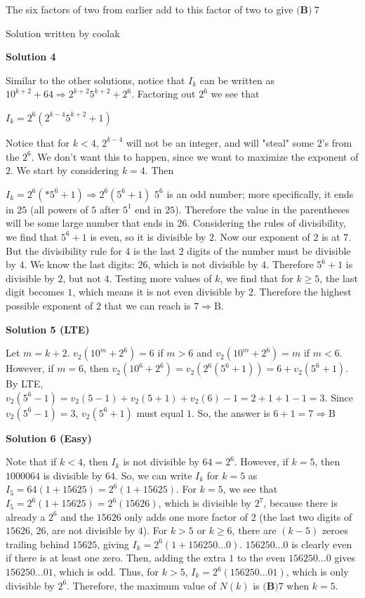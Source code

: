 \begin{enumerate}
 The six factors of two from earlier add to this factor of two to give $\textbf{(B)}\ 7\qquad$

 Solution written by coolak

 


 



\textbf{Solution 4}

Similar to the other solutions, notice that $I_k$ can be written as $10^{k+2}+64 \Rightarrow 2^{k+2}5^{k+2}+2^6$. Factoring out $2^6$ we see that

 $I_k = 2^6(2^{k-4}5^{k+2}+1)$

 Notice that for $k < 4$, $2^{k-4}$ will not be an integer, and will "steal" some $2$'s from the $2^6$. We don't want this to happen, since we want to maximize the exponent of $2$. We start by considering $k = 4$. Then

 $I_k = 2^6(*5^6+1) \Rightarrow 2^6(5^6+1)$
$5^6$ is an odd number; more specifically, it ends in $25$ (all powers of $5$ after $5^1$ end in $25$). Therefore the value in the parentheses will be some large number that ends in $26$. Considering the rules of divisibility, we find that $5^6+1$ is even, so it is divisible by $2$. Now our exponent of $2$ is at $7$. But the divisibility rule for $4$ is the last $2$ digits of the number must be divisible by $4$. We know the last digits: $26$, which is not divisible by $4$. Therefore $5^6 + 1$ is divisible by $2$, but not $4$. Testing more values of $k$, we find that for $k \ge 5$, the last digit becomes $1$, which means it is not even divisible by $2$. Therefore the highest possible exponent of $2$ that we can reach is $7 \Rightarrow \boxed{\text{B}}$.

 



\textbf{Solution 5 (LTE)}

Let $m=k+2$. $v_2(10^m+2^6)=6$ if $m>6$ and $v_2(10^m+2^6)=m$ if $m<6$. However, if $m=6$, then $v_2(10^6+2^6)=v_2(2^6(5^6+1))=6+v_2(5^6+1)$. By LTE, $v_2(5^6-1)=v_2(5-1)+v_2(5+1)+v_2(6)-1=2+1+1-1=3$. Since $v_2(5^6-1)=3$, $v_2(5^6+1)$ must equal $1$. So, the answer is $6+1=7 \Rightarrow \boxed{\text{B}}$




\textbf{Solution 6 (Easy)}

Note that if $k<4$, then $I_k$ is not divisible by $64=2^6$. However, if $k=5$, then $1000064$ is divisible by $64$. So, we can write $I_k$ for $k=5$ as $I_5=64(1+15625)=2^6(1+15625)$. For $k=5$, we see that $I_5=2^6(1+15625)=2^6(15626)$, which is divisible by $2^7$, because there is already a $2^6$ and the $15626$ only adds one more factor of $2$ (the last two digits of $15626$, $26$, are not divisible by $4$). For $k>5$ or $k\geq6$, there are $(k-5)$ zeroes trailing behind $15625$, giving $I_k=2^6(1+156250...0)$. $156250...0$ is clearly even if there is at least one zero. Then, adding the extra $1$ to the even $156250...0$ gives $156250...01$, which is odd. Thus, for $k>5$, $I_k=2^6(156250...01)$, which is only divisible by $2^6$. Therefore, the maximum value of $N(k)$ is $\boxed{\textbf{(B)} 7}$ when $k=5$.


\end{enumerate}
